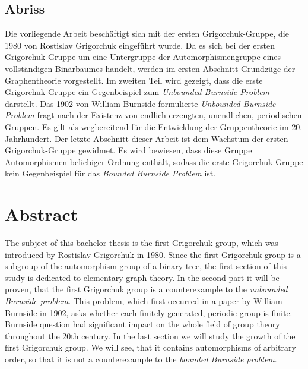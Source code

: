 \thispagestyle{empty}

\begin{de}
\section*{Abriss}
Die vorliegende Arbeit besch\"aftigt sich mit der ersten Grigorchuk-Gruppe, die 1980 von Rostislav Grigorchuk eingef\"uhrt wurde. Da es sich bei der ersten Grigorchuk-Gruppe um eine Untergruppe der Automorphismengruppe eines vollst\"andigen Bin\"arbaumes handelt, werden im ersten Abschnitt Grundz\"uge der Graphentheorie vorgestellt. Im zweiten Teil wird gezeigt, dass die erste Grigorchuk-Gruppe ein Gegenbeispiel zum \emph{Unbounded Burnside Problem} darstellt. Das 1902 von William Burnside formulierte \emph{Unbounded Burnside Problem} fragt nach der Existenz von  endlich erzeugten, unendlichen, periodischen Gruppen. Es gilt als wegbereitend f\"ur die Entwicklung der Gruppentheorie im 20. Jahrhundert. Der letzte Abschnitt dieser Arbeit ist dem Wachstum der ersten Grigorchuk-Gruppe gewidmet. Es wird bewiesen, dass diese Gruppe Automorphismen beliebiger Ordnung enth\"alt, sodass die erste Grigorchuk-Gruppe kein Gegenbeispiel f\"ur das \emph{Bounded Burnside Problem} ist.
\end{de}

\section*{Abstract}
The subject of this bachelor thesis is the first Grigorchuk group, which was introduced by Rostislav Grigorchuk in 1980. Since the first Grigorchuk group is a subgroup of the automorphism group of a binary tree, the first section of this study is dedicated to elementary graph theory. In the second part it will be proven, that the first Grigorchuk group is a counterexample to the \emph{unbounded Burnside problem}. This problem, which first occurred in a paper by William Burnside in 1902, asks whether each finitely generated, periodic group is finite. Burnside question had significant impact on the whole field of group theory throughout the 20th century. In the last section we will study the growth of the first Grigorchuk group. We will see, that it contains automorphisms of arbitrary order, so that it is not a counterexample to the \emph{bounded Burnside problem}.

\newpage